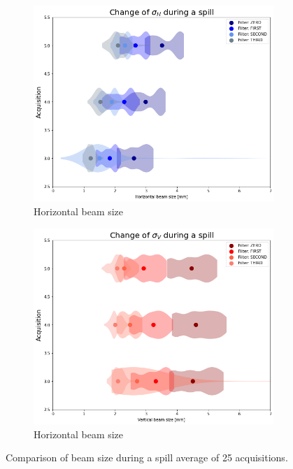 \begin{figure}[htbp]
    \centering
    \begin{subfigure}[b]{0.49\textwidth}
        \centering
        \includegraphics[width=\textwidth]{03_Empirical_Measurements/images/sigmaH.png}
        \caption{Horizontal beam size}
        \label{fig:sigmaH}
    \end{subfigure}
    \hfill
    \begin{subfigure}[b]{0.49\textwidth}
        \centering
        \includegraphics[width=\textwidth]{03_Empirical_Measurements/images/sigmaV.png}
        \caption{Horizontal beam size}
        \label{fig:sigmaV}
    \end{subfigure}
    \caption{Comparison of beam size during a spill average of 25 acquisitions.}
    \label{fig:filter_sigma}
\end{figure}

